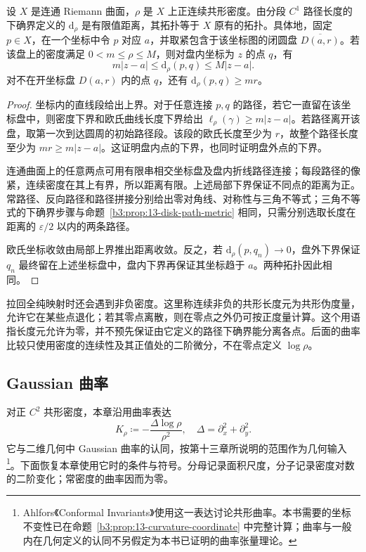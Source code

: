 \begin{proposition}[正密度的路径距离]\label{b3:prop:14-positive-density-distance}
设 \(X\) 是连通 Riemann 曲面，\(\rho\) 是 \(X\) 上正连续共形密度。由分段 \(C^1\) 路径长度的下确界定义的 \(\mathrm d_\rho\) 是有限值距离，其拓扑等于 \(X\) 原有的拓扑。具体地，固定 \(p\in X\)，在一个坐标中令 \(p\) 对应 \(a\)，并取紧包含于该坐标图的闭圆盘 \(\overline{D(a,r)}\)。若该盘上的密度满足 \(0<m\le\rho\le M\)，则对盘内坐标为 \(z\) 的点 \(q\)，有
\[
 m|z-a|\le\mathrm d_\rho(p,q)\le M|z-a|.
\]
对不在开坐标盘 \(D(a,r)\) 内的点 \(q\)，还有 \(\mathrm d_\rho(p,q)\ge mr\)。
\end{proposition}
\begin{proof}
坐标内的直线段给出上界。对于任意连接 \(p,q\) 的路径，若它一直留在该坐标盘中，则密度下界和欧氏曲线长度下界给出 \(\ell_\rho(\gamma)\ge m|z-a|\)。若路径离开该盘，取第一次到达圆周的初始路径段。该段的欧氏长度至少为 \(r\)，故整个路径长度至少为 \(mr\ge m|z-a|\)。这证明盘内点的下界，也同时证明盘外点的下界。

连通曲面上的任意两点可用有限串相交坐标盘及盘内折线路径连接；每段路径的像紧，连续密度在其上有界，所以距离有限。上述局部下界保证不同点的距离为正。常路径、反向路径和路径拼接分别给出零对角线、对称性与三角不等式；三角不等式的下确界步骤与命题~\ref{b3:prop:13-disk-path-metric} 相同，只需分别选取长度在距离的 \(\varepsilon/2\) 以内的两条路径。

欧氏坐标收敛由局部上界推出距离收敛。反之，若 \(\mathrm d_\rho(p,q_n)\to0\)，盘外下界保证 \(q_n\) 最终留在上述坐标盘中，盘内下界再保证其坐标趋于 \(a\)。两种拓扑因此相同。
\end{proof}

拉回全纯映射时还会遇到非负密度。这里称连续非负的共形长度元为共形伪度量，允许它在某些点退化；若其零点离散，则在零点之外仍可按正度量计算。这个用语指长度元允许为零，并不预先保证由它定义的路径下确界能分离各点。后面的曲率比较只使用密度的连续性及其正值处的二阶微分，不在零点定义 \(\log\rho\)。

\subsection{Gaussian 曲率}
\label{b3:subsec:140102}

对正 \(C^2\) 共形密度，本章沿用曲率表达
\[
 K_\rho\coloneqq-\frac{\Delta\log\rho}{\rho^2},
 \quad \Delta=\partial_x^2+\partial_y^2.
\]
它与二维几何中 Gaussian 曲率的认同，按第十三章所说明的范围作为几何输入\footnote{Ahlfors《Conformal Invariants》\cite[1-5 Ultrahyperbolic Metrics, p.~12]{Ahlfors2010Conformal}使用这一表达讨论共形曲率。本书需要的坐标不变性已在命题~\ref{b3:prop:13-curvature-coordinate} 中完整计算；曲率与一般内在几何定义的认同不另假定为本书已证明的曲率张量理论。}。下面恢复本章使用它时的条件与符号。分母记录面积尺度，分子记录密度对数的二阶变化；常密度的曲率因而为零。

